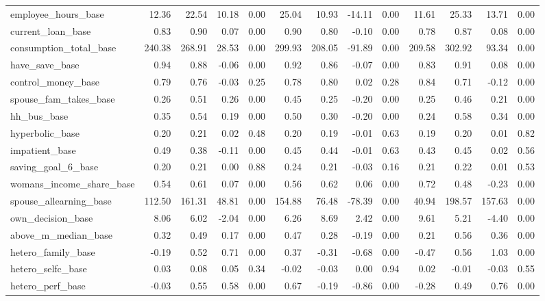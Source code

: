 \begin{tabular}{lrrrrrrrrrrrr}
\addlinespace
employee\_hours\_base & 12.36 & 22.54 & 10.18 & 0.00 & 25.04 & 10.93 & -14.11 & 0.00 & 11.61 & 25.33 & 13.71 & 0.00\\
current\_loan\_base & 0.83 & 0.90 & 0.07 & 0.00 & 0.90 & 0.80 & -0.10 & 0.00 & 0.78 & 0.87 & 0.08 & 0.00\\
consumption\_total\_base & 240.38 & 268.91 & 28.53 & 0.00 & 299.93 & 208.05 & -91.89 & 0.00 & 209.58 & 302.92 & 93.34 & 0.00\\
have\_save\_base & 0.94 & 0.88 & -0.06 & 0.00 & 0.92 & 0.86 & -0.07 & 0.00 & 0.83 & 0.91 & 0.08 & 0.00\\
control\_money\_base & 0.79 & 0.76 & -0.03 & 0.25 & 0.78 & 0.80 & 0.02 & 0.28 & 0.84 & 0.71 & -0.12 & 0.00\\
\addlinespace
spouse\_fam\_takes\_base & 0.26 & 0.51 & 0.26 & 0.00 & 0.45 & 0.25 & -0.20 & 0.00 & 0.25 & 0.46 & 0.21 & 0.00\\
hh\_bus\_base & 0.35 & 0.54 & 0.19 & 0.00 & 0.50 & 0.30 & -0.20 & 0.00 & 0.24 & 0.58 & 0.34 & 0.00\\
hyperbolic\_base & 0.20 & 0.21 & 0.02 & 0.48 & 0.20 & 0.19 & -0.01 & 0.63 & 0.19 & 0.20 & 0.01 & 0.82\\
impatient\_base & 0.49 & 0.38 & -0.11 & 0.00 & 0.45 & 0.44 & -0.01 & 0.63 & 0.43 & 0.45 & 0.02 & 0.56\\
saving\_goal\_6\_base & 0.20 & 0.21 & 0.00 & 0.88 & 0.24 & 0.21 & -0.03 & 0.16 & 0.21 & 0.22 & 0.01 & 0.53\\
\addlinespace
womans\_income\_share\_base & 0.54 & 0.61 & 0.07 & 0.00 & 0.56 & 0.62 & 0.06 & 0.00 & 0.72 & 0.48 & -0.23 & 0.00\\
spouse\_allearning\_base & 112.50 & 161.31 & 48.81 & 0.00 & 154.88 & 76.48 & -78.39 & 0.00 & 40.94 & 198.57 & 157.63 & 0.00\\
own\_decision\_base & 8.06 & 6.02 & -2.04 & 0.00 & 6.26 & 8.69 & 2.42 & 0.00 & 9.61 & 5.21 & -4.40 & 0.00\\
above\_m\_median\_base & 0.32 & 0.49 & 0.17 & 0.00 & 0.47 & 0.28 & -0.19 & 0.00 & 0.21 & 0.56 & 0.36 & 0.00\\
hetero\_family\_base & -0.19 & 0.52 & 0.71 & 0.00 & 0.37 & -0.31 & -0.68 & 0.00 & -0.47 & 0.56 & 1.03 & 0.00\\
\addlinespace
hetero\_selfc\_base & 0.03 & 0.08 & 0.05 & 0.34 & -0.02 & -0.03 & 0.00 & 0.94 & 0.02 & -0.01 & -0.03 & 0.55\\
hetero\_perf\_base & -0.03 & 0.55 & 0.58 & 0.00 & 0.67 & -0.19 & -0.86 & 0.00 & -0.28 & 0.49 & 0.76 & 0.00\\
\bottomrule
\end{tabular}
